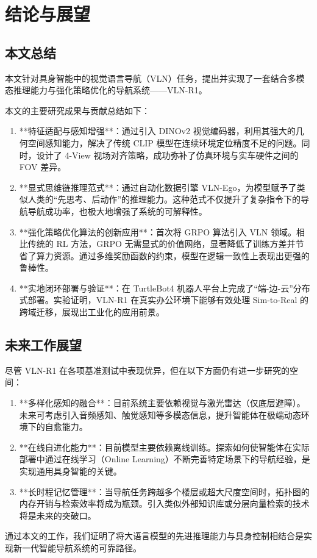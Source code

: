 \cleardoublepage

\section{结论与展望}

\subsection{本文总结}
本文针对具身智能中的视觉语言导航（VLN）任务，提出并实现了一套结合多模态推理能力与强化策略优化的导航系统——VLN-R1。

本文的主要研究成果与贡献总结如下：
\begin{enumerate}
    \item **特征适配与感知增强**：通过引入 DINOv2 视觉编码器，利用其强大的几何空间感知能力，解决了传统 CLIP 模型在连续环境定位精度不足的问题。同时，设计了 4-View 视场对齐策略，成功弥补了仿真环境与实车硬件之间的 FOV 差异。
    \item **显式思维链推理范式**：通过自动化数据引擎 VLN-Ego，为模型赋予了类似人类的“先思考、后动作”的推理能力。这种范式不仅提升了复杂指令下的导航导航成功率，也极大地增强了系统的可解释性。
    \item **强化策略优化算法的创新应用**：首次将 GRPO 算法引入 VLN 领域。相比传统的 RL 方法，GRPO 无需显式的价值网络，显著降低了训练方差并节省了算力资源。通过多维奖励函数的约束，模型在逻辑一致性上表现出更强的鲁棒性。
    \item **实地闭环部署与验证**：在 TurtleBot4 机器人平台上完成了“端-边-云”分布式部署。实验证明，VLN-R1 在真实办公环境下能够有效处理 Sim-to-Real 的跨域迁移，展现出工业化的应用前景。
\end{enumerate}

\subsection{未来工作展望}
尽管 VLN-R1 在各项基准测试中表现优异，但在以下方面仍有进一步研究的空间：
\begin{enumerate}
    \item **多样化感知的融合**：目前系统主要依赖视觉与激光雷达（仅底层避障）。未来可考虑引入音频感知、触觉感知等多模态信息，提升智能体在极端动态环境下的自愈能力。
    \item **在线自进化能力**：目前模型主要依赖离线训练。探索如何使智能体在实际部署中通过在线学习（Online Learning）不断完善特定场景下的导航经验，是实现通用具身智能的关键。
    \item **长时程记忆管理**：当导航任务跨越多个楼层或超大尺度空间时，拓扑图的内存开销与检索效率将成为瓶颈。引入类似外部知识库或分层向量检索的技术将是未来的突破口。
\end{enumerate}
通过本文的工作，我们证明了将大语言模型的先进推理能力与具身控制相结合是实现新一代智能导航系统的可靠路径。
